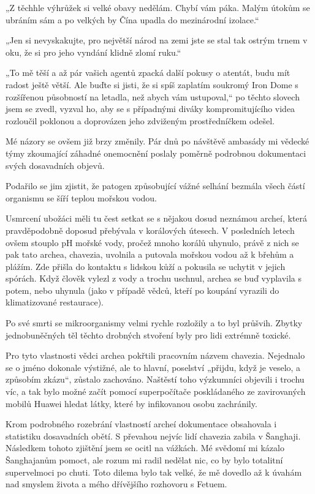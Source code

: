 „Z těchhle výhrůžek si velké obavy nedělám. Chybí vám páka. Malým útokům se ubráním sám a po velkých by Čína upadla do mezinárodní izolace.“

„Jen si nevyskakujte, pro největší národ na zemi jste se stal tak ostrým trnem v oku, že si pro jeho vyndání klidně zlomí ruku.“

„To mě těší a až pár vašich agentů zpacká další pokusy o atentát, budu mít radost ještě větší. Ale buďte si jisti, že si spíš zaplatím soukromý Iron Dome s rozšířenou působností na letadla, než abych vám ustupoval,“ po těchto slovech jsem se zvedl, vyzval ho, aby se s případnými diváky kompromitujícího videa rozloučil poklonou a doprovázen jeho zdviženým prostředníčkem odešel.
\vspace{0.75cm}

Mé názory se ovšem již brzy změnily. Pár dnů po návštěvě ambasády mi vědecké týmy zkoumající záhadné onemocnění poslaly poměrně podrobnou dokumentaci svých dosavadních objevů.

Podařilo se jim zjistit, že patogen způsobující vážné selhání bezmála všech částí organismu se šíří teplou mořskou vodou. 

Usmrcení ubožáci měli tu čest setkat se s nějakou dosud neznámou archeí, která pravděpodobně doposud přebývala v korálových útesech.  V posledních letech ovšem stouplo pH mořské vody, pročež mnoho korálů uhynulo, právě z nich se pak tato archea, chavezia, uvolnila a putovala mořskou vodou až k břehům a plážím. Zde přišla do kontaktu s lidskou kůží a pokusila se uchytit v jejich spórách. Když člověk vylezl z vody a trochu uschnul, archea se buď vyplavila s potem, nebo uhynula (jako v případě vědců, kteří po koupání vyrazili do klimatizované restaurace).

Po své smrti se mikroorganismy velmi rychle rozložily a to byl průšvih. Zbytky jednobuněčných těl těchto drobných stvoření byly pro lidi extrémně toxické.

Pro tyto vlastnosti vědci archea pokřtili pracovním názvem chavezia. Nejednalo se o jméno dokonale výstižné, ale to hlavní, poselství „přijdu, když je veselo, a způsobím zkázu“, zůstalo zachováno. Naštěstí toho výzkumníci objevili i trochu víc, a tak bylo možné začít pomocí superpočítače poskládaného ze zavirovaných mobilů Huawei hledat látky, které by infikovanou osobu zachránily.

Krom podrobného rozebrání vlastností archeí dokumentace obsahovala i statistiku dosavadních obětí. S převahou nejvíc lidí chavezia zabila v Šanghaji. Následkem tohoto zjištění jsem se ocitl na vážkách. Mé svědomí mi kázalo Šanghajanům pomoct, ale rozum mi radil nedělat nic, co by bylo totalitní supervelmoci po chuti. Toto dilema bylo tak velké, že mě dovedlo až k úvahám nad smyslem života a mého dřívějšího rozhovoru s Fetuem.

